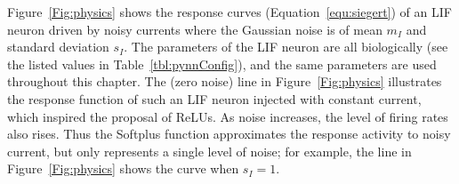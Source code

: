 	Figure~\ref{Fig:physics} shows the response curves (Equation~\ref{equ:siegert}) of an LIF neuron driven by noisy currents where the Gaussian noise is of mean $m_I$ and standard deviation $s_I$.
	The parameters of the LIF neuron are all biologically \DIFdelbegin {}\DIFdelend \DIFaddbegin {}\DIFaddend (see the listed values in Table~\ref{tbl:pynnConfig}), and the same parameters are used throughout this chapter.
	The \DIFdelbegin {}\DIFdelend \DIFaddbegin {}\DIFaddend (zero noise) line in Figure~\ref{Fig:physics} illustrates the response function of such an LIF neuron injected with constant current, which inspired the proposal of ReLUs.
	As noise increases, the level of firing rates also rises.
	Thus the Softplus function approximates the response activity to noisy current, but only represents a single level of noise; for example, the \DIFdelbegin {}\DIFdelend \DIFaddbegin {}\DIFaddend line in Figure~\ref{Fig:physics} shows the curve when $s_I=1$.
		\DIFdelbegin %

